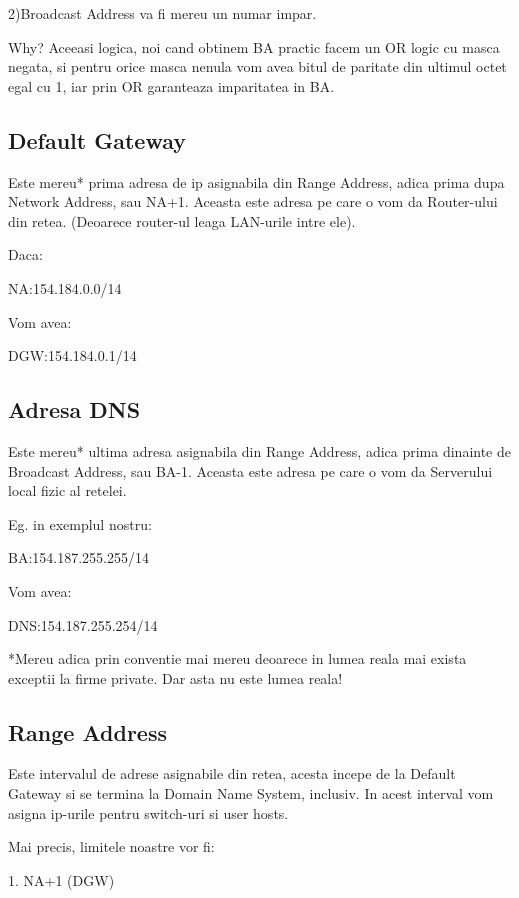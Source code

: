 \documentclass{article}
\begin{document}
2)Broadcast Address va fi mereu un numar impar. 

Why? Aceeasi logica, noi cand obtinem BA practic facem un OR logic cu masca negata, si pentru orice masca nenula vom avea bitul de paritate din ultimul octet egal cu 1, iar prin OR garanteaza imparitatea in BA.


\subsection{Default Gateway}Este mereu* prima adresa de ip asignabila din Range Address, adica prima dupa Network Address, sau NA+1. Aceasta este adresa pe care o vom da Router-ului din retea. (Deoarece router-ul leaga LAN-urile intre ele).

Daca:
\begin{center}
    NA:154.184.0.0/14
\end{center}
Vom avea:
\begin{center}
    DGW:154.184.0.1/14 
\end{center}

\subsection{Adresa DNS}
Este mereu* ultima adresa asignabila din Range Address, adica prima dinainte de Broadcast Address, sau BA-1. Aceasta este adresa pe care o vom da Serverului local fizic al retelei.

Eg. in exemplul nostru:

\begin{center}
    BA:154.187.255.255/14
\end{center}
Vom avea:
\begin{center}
    DNS:154.187.255.254/14
\end{center}


*Mereu adica prin conventie mai mereu deoarece in lumea reala mai exista exceptii la firme private. Dar asta nu este lumea reala!

\subsection{Range Address} Este intervalul de adrese asignabile din retea, acesta incepe de la Default Gateway si se termina la Domain Name System, inclusiv. In acest interval vom asigna ip-urile pentru switch-uri si user hosts.

Mai precis, limitele noastre vor fi:

1. NA+1 (DGW)
\end{document}

